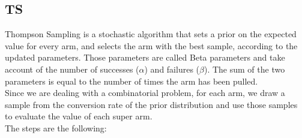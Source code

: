 \subsection{TS}
Thompson Sampling is a stochastic algorithm that sets a prior on the expected value for every arm, and selects the arm with the best sample, according to the updated parameters. Those parameters are called Beta parameters and take account of the number of successes ($\alpha$) and failures ($\beta$). The sum of the two parameters is equal to the number of times the arm has been pulled.\\
Since we are dealing with a combinatorial problem, for each arm, we draw a sample from the conversion rate of the prior distribution and use those samples to evaluate the value of each super arm.\\
The steps are the following:
